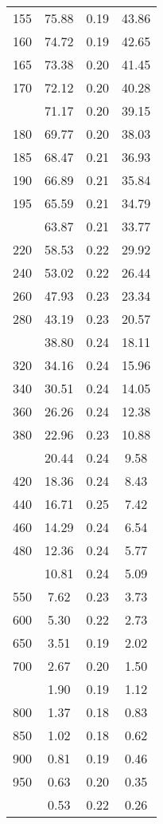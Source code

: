 \begin{table}[ht]
\begin{tabular}{lccc}
  155 & 75.88 & 0.19 & 43.86 \\ 
  160 & 74.72 & 0.19 & 42.65 \\ 
  165 & 73.38 & 0.20 & 41.45 \\ 
  170 & 72.12 & 0.20 & 40.28 \\ 
   \addlinespace
175 & 71.17 & 0.20 & 39.15 \\ 
  180 & 69.77 & 0.20 & 38.03 \\ 
  185 & 68.47 & 0.21 & 36.93 \\ 
  190 & 66.89 & 0.21 & 35.84 \\ 
  195 & 65.59 & 0.21 & 34.79 \\ 
   \addlinespace
200 & 63.87 & 0.21 & 33.77 \\ 
  220 & 58.53 & 0.22 & 29.92 \\ 
  240 & 53.02 & 0.22 & 26.44 \\ 
  260 & 47.93 & 0.23 & 23.34 \\ 
  280 & 43.19 & 0.23 & 20.57 \\ 
   \addlinespace
300 & 38.80 & 0.24 & 18.11 \\ 
  320 & 34.16 & 0.24 & 15.96 \\ 
  340 & 30.51 & 0.24 & 14.05 \\ 
  360 & 26.26 & 0.24 & 12.38 \\ 
  380 & 22.96 & 0.23 & 10.88 \\ 
   \addlinespace
400 & 20.44 & 0.24 & 9.58 \\ 
  420 & 18.36 & 0.24 & 8.43 \\ 
  440 & 16.71 & 0.25 & 7.42 \\ 
  460 & 14.29 & 0.24 & 6.54 \\ 
  480 & 12.36 & 0.24 & 5.77 \\ 
   \addlinespace
500 & 10.81 & 0.24 & 5.09 \\ 
  550 & 7.62 & 0.23 & 3.73 \\ 
  600 & 5.30 & 0.22 & 2.73 \\ 
  650 & 3.51 & 0.19 & 2.02 \\ 
  700 & 2.67 & 0.20 & 1.50 \\ 
   \addlinespace
750 & 1.90 & 0.19 & 1.12 \\ 
  800 & 1.37 & 0.18 & 0.83 \\ 
  850 & 1.02 & 0.18 & 0.62 \\ 
  900 & 0.81 & 0.19 & 0.46 \\ 
  950 & 0.63 & 0.20 & 0.35 \\ 
   \addlinespace
1000 & 0.53 & 0.22 & 0.26 \\ 
   \bottomrule
\end{tabular}
\end{table}
